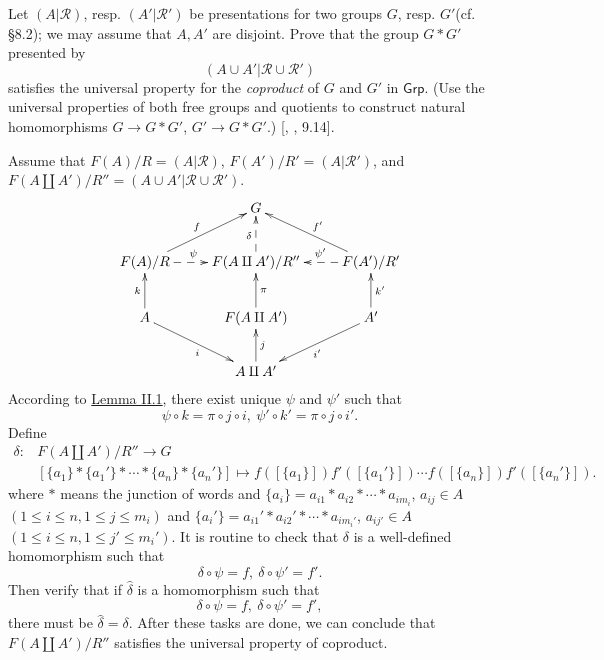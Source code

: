 \documentclass[12pt,letterpaper,boxed]{hmcpset}
\newcommand{\Grp}{\mathsf{Grp}}
\begin{document}
\begin{problem}[8.7]
Let $(A|\mathscr{R})$, resp. $(A'|\mathscr{R}')$ be presentations for two groups $G$, resp. $G'$(cf. §8.2); we may assume that $A, A'$ are disjoint. Prove that the group $G*G'$ presented by
\[
(A\cup A'|\mathscr{R}\cup \mathscr{R}')
\]
satisfies the universal property for the \emph{coproduct} of $G$ and $G'$ in $\Grp$. (Use the universal properties of both free groups and quotients to construct natural homomorphisms $G\to G*G'$, $G'\to G* G'$.) [, , 9.14].
\end{problem}
\begin{solution}
Assume that $F(A)/R=(A|\mathscr{R})$, $F(A')/R'=(A|\mathscr{R}')$, and $F(A\amalg A')/R''=(A\cup A'|\mathscr{R}\cup \mathscr{R}')$.
	\[\xymatrix{
		&G&\\
		F(A)/R\ar[ru]^{f}\ar@{-->}[r]^{\psi\hspace{1em}}&F(A\amalg A')/R''\ar@{-->}[u]^{\delta}&F(A')/R'\ar[lu]_{f'}\ar@{-->}[l]_{\hspace{1em}\psi'}\\
		A\ar[rd]_{i}\ar[u]^{k}&F(A\amalg A')\ar[u]_{\pi}&A'\ar[ld]^{i'}\ar[u]_{k'}\\
		&A\amalg A'\ar[u]_{j} &
	}\]
According to \hyperlink{Lemma II.1}{Lemma II.1}, there exist unique $\psi$ and $\psi'$ such that 
\[
\psi\circ k=\pi\circ j\circ i,\ \psi'\circ k'=\pi\circ j\circ i'.
\]
Define 
\begin{align*}
\delta:&F(A\amalg A')/R''\longrightarrow G\\
&[\{a_1\}*\{a_1'\}*\cdots*\{a_n\}*\{a_n'\}]\longmapsto f([\{a_1\}])f'([\{a_1'\}])\cdots f([\{a_n\}])f'([\{a_n'\}]).
\end{align*}
where $*$ means the junction of words and $\{a_i\}=a_{i1}*a_{i2}*\cdots *a_{im_i}$, $a_{ij}\in A$ $(1\le i\le n,1\le j\le m_i)$ and $\{a_i'\}=a_{i1}'*a_{i2}'*\cdots *a_{im_i'}$, $a_{ij'}\in A$ $(1\le i\le n,1\le j'\le m_i')$.
It is routine to check that $\delta$ is a well-defined homomorphism such that 
$$
\delta\circ\psi=f,\ \delta\circ\psi'=f'.
$$ 
Then verify that if $\hat{\delta}$ is a homomorphism such that 
$$
\delta\circ\psi=f,\ \delta\circ\psi'=f',
$$ 
there must be $\hat{\delta}=\delta$. After these tasks are done, we can conclude that $F(A\amalg A')/R''$ satisfies the universal property of coproduct.

\end{solution}
\end{document}
